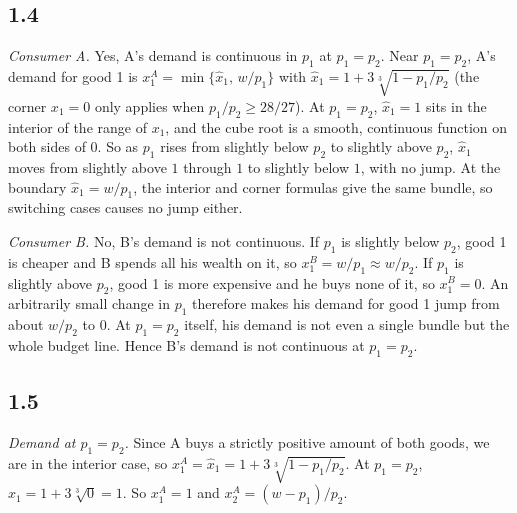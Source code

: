 \documentclass[12pt,letterpaper]{article}
\newif\ifshowhints
\newcommand{\hint}[1]{\ifshowhints{\color{blue}\small\textbf{Hint.} #1\par}\fi}
\begin{document}
\subsection*{1.4}

\hint{For A, check whether your formula from 1.3 jumps as $p_1$ crosses $p_2$. For B, compare $x_1^B$ for $p_1$ just below $p_2$ with $x_1^B$ for $p_1$ just above $p_2$. Can a function do that and still be continuous?}

\textit{Consumer A.} Yes, A's demand is continuous in $p_1$ at $p_1=p_2$. Near $p_1=p_2$, A's demand for good 1 is $x_1^A=\min\{\hat x_1,\,w/p_1\}$ with $\hat x_1 = 1+3\sqrt[3]{1-p_1/p_2}$ (the corner $x_1=0$ only applies when $p_1/p_2\ge 28/27$). At $p_1=p_2$, $\hat x_1=1$ sits in the interior of the range of $x_1$, and the cube root is a smooth, continuous function on both sides of $0$. So as $p_1$ rises from slightly below $p_2$ to slightly above $p_2$, $\hat x_1$ moves from slightly above $1$ through $1$ to slightly below $1$, with no jump. At the boundary $\hat x_1=w/p_1$, the interior and corner formulas give the same bundle, so switching cases causes no jump either.

\textit{Consumer B.} No, B's demand is not continuous. If $p_1$ is slightly below $p_2$, good 1 is cheaper and B spends all his wealth on it, so $x_1^B = w/p_1\approx w/p_2$. If $p_1$ is slightly above $p_2$, good 1 is more expensive and he buys none of it, so $x_1^B=0$. An arbitrarily small change in $p_1$ therefore makes his demand for good 1 jump from about $w/p_2$ to $0$. At $p_1=p_2$ itself, his demand is not even a single bundle but the whole budget line. Hence B's demand is not continuous at $p_1=p_2$.

\subsection*{1.5}

\hint{Plug $p_1=p_2$ into A's interior demand. Then differentiate $x_1^A$ with respect to $p_1$: what is the derivative of a cube root at $0$? Link this to 1.2: at $x_1=1$, A's indifference curve has the same slope and curvature as B's (locally almost linear), so a small change in $p_1/p_2$ moves A's demand a lot.}

\textit{Demand at $p_1=p_2$.} Since A buys a strictly positive amount of both goods, we are in the interior case, so $x_1^A=\hat x_1 = 1+3\sqrt[3]{1-p_1/p_2}$. At $p_1=p_2$, $\hat x_1 = 1+3\sqrt[3]{0}=1$. So $x_1^A=1$ and $x_2^A=(w-p_1)/p_2$.
\end{document}
